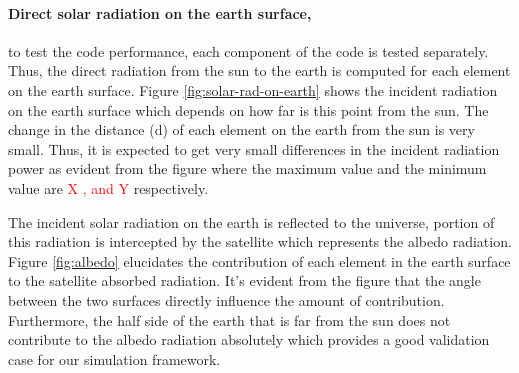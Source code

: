 \documentclass[11pt]{article}
\begin{document}
\paragraph{Direct solar radiation on the earth surface,} to test the code performance, each component of the code is tested separately. Thus, the direct radiation from the sun to the earth is computed for each element on the earth surface. Figure \ref{fig:solar-rad-on-earth} shows the incident radiation on the earth surface which depends on how far is this point from the sun. The change in the distance (d) of each element on the earth from the sun is very small. Thus, it is expected to get very small differences in the incident radiation power as evident from the figure where the maximum value and the minimum value are\textcolor{red}{ X , and Y} respectively. 



The incident solar radiation on the earth is reflected to the universe, portion of this radiation is intercepted by the satellite which represents the albedo radiation. Figure \ref{fig:albedo} elucidates the contribution of each element in the earth surface to the satellite absorbed radiation. It's evident from the figure that the angle between the two surfaces directly influence the amount of contribution. Furthermore, the half side of the earth that is far from the sun does not contribute to the albedo radiation absolutely which provides a good validation case for our simulation framework. 

\end{document}
